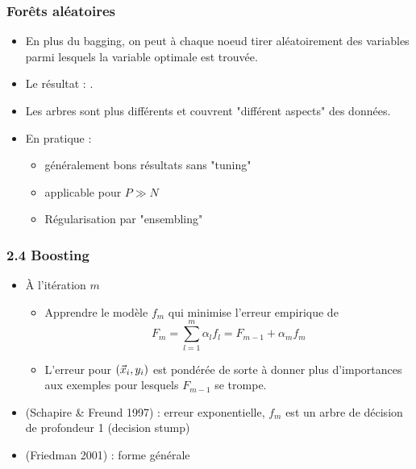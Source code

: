 \begin{frame}
  \frametitle{Forêts aléatoires}
  \begin{itemize}
    \item En plus du bagging, on peut à chaque noeud tirer aléatoirement des variables parmi lesquels la variable optimale est trouvée. 
    \item Le résultat : . 
    \item Les arbres sont plus différents et couvrent "différent aspects" des données. 
    \item En pratique : 
    \begin{itemize}
      \item généralement bons résultats sans "tuning"
      \item applicable pour $P \gg N$
      \item Régularisation par "ensembling"
    \end{itemize}
  \end{itemize}

\end{frame}

\begin{frame}
  \frametitle{2.4 Boosting}
  \begin{itemize}
  \item À l'itération $m$
    \begin{itemize}
    \item Apprendre le modèle $f_m$ qui minimise l'erreur empirique de
      \[
        F_m = \sum_{l=1}^m \alpha_l f_l = F_{m-1} + \alpha_m f_m 
      \]
    \item L'erreur pour $(\vec{x}_i, y_i)$ est pondérée de sorte à donner plus
      d'importances aux exemples pour lesquels $F_{m-1}$ se trompe.
    \end{itemize}
  \item {} (Schapire \& Freund 1997) : erreur exponentielle, $f_m$ est un
    arbre de décision de profondeur 1 (decision stump)
  \item {} (Friedman 2001) : forme générale
  \end{itemize}
\end{frame}



